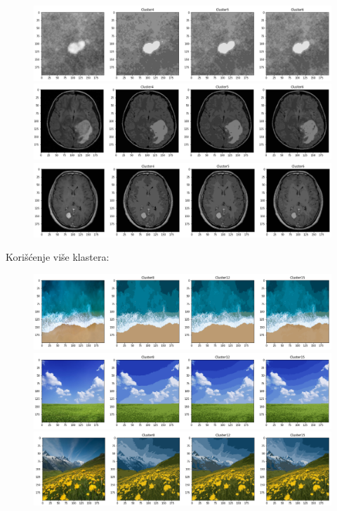 \documentclass{article}
\begin{document}
\begin{figure}[h!]
\centerline{\includegraphics[scale=0.45]{images/segmented_fuzzy_c_means0.png}}
\centerline{\includegraphics[scale=0.45]{images/segmented_fuzzy_c_means10.png}}
\centerline{\includegraphics[scale=0.45]{images/segmented_fuzzy_c_means2.png}}
\end{figure}

Kori\v{s}\'{c}enje vi\v{s}e klastera:

\newpage

\begin{figure}[h!]
\centerline{\includegraphics[scale=0.45]{images/ultra_segmented_fuzzy_c_means0.png}}
\centerline{\includegraphics[scale=0.45]{images/ultra_segmented_fuzzy_c_means1.png}}
\centerline{\includegraphics[scale=0.45]{images/ultra_segmented_fuzzy_c_means2.png}}
\end{figure}
\end{document}
